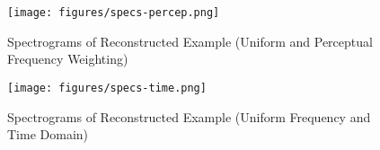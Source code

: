 \begin{figure}
	\centering
	\texttt{[image: figures/specs-percep.png]}
	\caption{Spectrograms of Reconstructed Example (Uniform and Perceptual Frequency Weighting)}
	\label{fig:specs-percep}
\end{figure}

\begin{figure}
	\centering
	\texttt{[image: figures/specs-time.png]}
	\caption{Spectrograms of Reconstructed Example (Uniform Frequency and Time Domain)}
	\label{fig:specs-time}
\end{figure}
